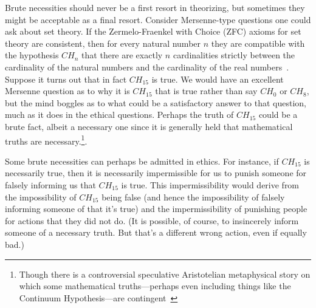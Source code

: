 Brute necessities should never be a first resort in theorizing, but sometimes they might be acceptable as a final resort. Consider
Mersenne-type questions one could ask about set theory. If the Zermelo-Fraenkel with Choice (ZFC) axioms for set theory are consistent, then for every natural number
$n$ they are compatible with the hypothesis $CH_n$ that there are exactly $n$ cardinalities strictly between the cardinality of the natural numbers and
the cardinality of the real numbers~\parencite{SolovayCanBe}. Suppose it turns out that in fact $CH_{15}$ is true.
We would have an excellent Mersenne question as to why it is $CH_{15}$ that is true rather than say $CH_0$ or $CH_8$, but the mind boggles as to what could be a satisfactory answer to that
question, much as it does in the ethical questions. Perhaps the truth of $CH_{15}$ could be a brute fact, albeit a necessary one since it is generally held that mathematical truths are necessary.\footnote{Though there is a 
controversial speculative Aristotelian metaphysical story on which some mathematical truths---perhaps even including things like the Continuum Hypothesis---are contingent~\parencite{PrussInfinities}}. 

Some brute necessities can perhaps be admitted in ethics. For instance, if $CH_{15}$ is necessarily true, then it is necessarily impermissible 
for us to punish someone for falsely informing us that $CH_{15}$ is true. This impermissibility would derive from the impossibility of $CH_{15}$ being
false (and hence the impossibility of falsely informing someone of that it's true) and the impermissibility of punishing people for actions that they did not 
do. (It is possible, of course, to insincerely inform someone of a necessary truth. But that's a different wrong action, even if equally bad.) 

